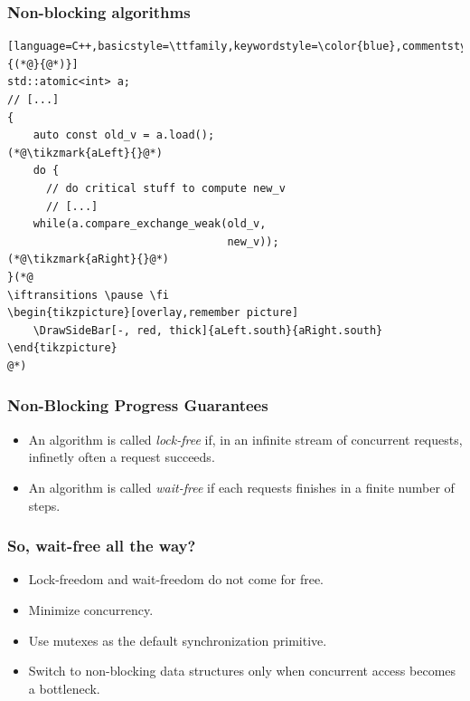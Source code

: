 \documentclass{beamer}
\newcommand{\tikzmark}[2]{%
     \tikz[overlay,remember picture] \node[text=black,
           inner sep=2pt] (#1) {#2};}
\newcommand{\HorizontalShiftForBar}{2.0em,+0.0ex}%
\newcommand{\Stub}{0.0em,-0.6ex}%
\newcommand{\DrawSideBar}[3][]{%
        \coordinate (top left)  at ($(#2)       +(\HorizontalShiftForBar)$);
        \coordinate (start)     at ($(top left) +(\Stub)$);
        \coordinate (top right) at ($(#3)       +(\HorizontalShiftForBar)$);
        \coordinate (end)       at ($(top right)+(\Stub)$);
        \draw [#1] (start) -- (top left) -- (top right) -- (end);
}%
\newif\iftransitions
\begin{document}
\begin{frame}[fragile]

\frametitle{Non-blocking algorithms}

\begin{lstlisting}[language=C++,basicstyle=\ttfamily,keywordstyle=\color{blue},commentstyle=\color{teal}\itshape,showstringspaces=false,escapeinside={(*@}{@*)}]
std::atomic<int> a;
// [...]
{
    auto const old_v = a.load();
(*@\tikzmark{aLeft}{}@*)
    do {
      // do critical stuff to compute new_v
      // [...]
    while(a.compare_exchange_weak(old_v,
                                  new_v));
(*@\tikzmark{aRight}{}@*)
}(*@
\iftransitions \pause \fi
\begin{tikzpicture}[overlay,remember picture]
    \DrawSideBar[-, red, thick]{aLeft.south}{aRight.south}
\end{tikzpicture}
@*)\end{lstlisting}

\end{frame}


\begin{frame}[fragile]

\frametitle{Non-Blocking Progress Guarantees}

\begin{itemize}
    \setlength\itemsep{1.5em}
    \item An algorithm is called \emph{lock-free} if, in an infinite stream of concurrent requests, infinetly often a request succeeds.

    \iftransitions \pause \fi

    \item An algorithm is called \emph{wait-free} if each requests finishes in a finite number of steps.
\end{itemize}

\end{frame}

\begin{frame}
  \frametitle{So, wait-free all the way?}
  
  \iftransitions \pause \fi
  
  \begin{itemize}
    \setlength\itemsep{1.5em}
    \item Lock-freedom and wait-freedom do not come for free.
    
    \iftransitions \pause \fi
    
    \item Minimize concurrency.
    
    \iftransitions \pause \fi
    
    \item Use mutexes as the default synchronization primitive.
    
    \iftransitions \pause \fi
    
    \item Switch to non-blocking data structures only when concurrent access becomes a bottleneck.
  \end{itemize}
\end{frame}
\end{document}
